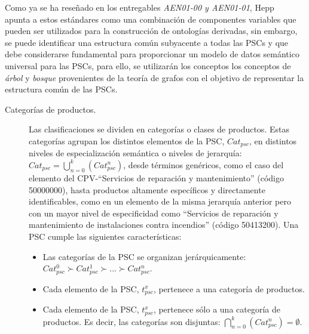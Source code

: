 Como ya se ha reseñado en los entregables \textit{AEN01-00 y AEN01-01}, Hepp~\cite{HeppTrueComplexity,HeppEclass,HeppMethodology} apunta
a estos estándares como una combinación de componentes variables que pueden ser utilizados 
para la construcción de ontologías derivadas, sin embargo, se puede identificar 
una estructura común subyacente a todas las PSCs y que debe considerarse fundamental para 
proporcionar un modelo de datos semántico universal para las PSCs, para ello, se utilizarán 
los conceptos los conceptos de \textit{árbol} y \textit{bosque} provenientes de la teoría de 
grafos con el objetivo de representar la estructura común de las PSCs. 

\begin{description}
 \item [Categorías de productos.] Las clasificaciones se dividen en categorías o
clases de productos. Estas categorías agrupan los distintos elementos de la PSC,
$Cat_{psc}$, en distintos niveles de especialización semántica o niveles de
jerarquía: $Cat_{psc} = \displaystyle\bigcup_{n=0}^k{(Cat_{psc}^n)}$, desde
términos genéricos, como el caso del elemento del \gls{CPV}-``Servicios de reparación y mantenimiento'' (código 50000000), hasta productos altamente
específicos y directamente identificables, como en un elemento de la misma jerarquía anterior pero con un mayor nivel 
de especificidad como ``Servicios de reparación y mantenimiento de instalaciones contra incendios'' (código 50413200). Una PSC cumple las siguientes
características:
\begin{itemize}
 \item Las categorías de la PSC se organizan jerárquicamente: $Cat_{psc}^0\succ
Cat_{psc}^1\succ...\succ Cat_{psc}^n $.
 \item Cada elemento de la PSC, $t_{psc}^x$, pertenece a una categoría de
productos.
 \item Cada elemento de la PSC, $t_{psc}^x$, pertenece sólo a una categoría de
productos. Es decir, las categorías son disjuntas:
$\displaystyle\bigcap_{n=0}^k{(Cat_{psc}^n)}=\emptyset$.
\end{itemize}



\end{description}
